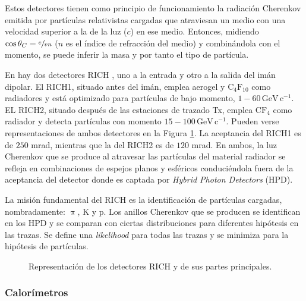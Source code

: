 Estos detectores tienen como principio de funcionamiento la radiación Cherenkov emitida por partículas relativistas cargadas que atraviesan un medio con una velocidad superior a la de la luz ($c$) en ese medio. Entonces, midiendo $\cos \theta_C = \sfrac{c}{vn}$ ($n$ es el índice de refracción del medio) y combinándola con el momento, se puede inferir la masa y por tanto el tipo de partícula.

En \lhcb hay dos detectores RICH \cite{Alves:1129809}, uno a la entrada y otro a la salida del imán dipolar. El RICH1, situado antes del imán, emplea aerogel y $\mathrm{C_4F_{10}}$ como radiadores y está optimizado para partículas de bajo momento, $1-60 \, \mathrm{GeV\, c^{-1}}$. EL RICH2, situado después de las estaciones de trazado Tx, emplea $\mathrm{CF_4}$ como radiador y detecta partículas con momento $15-100 \, \mathrm{GeV\, c^{-1}}$. Pueden verse representaciones de ambos detectores en la Figura \ref{fig_richdectectors}.
%
La aceptancia del RICH1 es de $250$ mrad, mientras que la del RICH2 es de $120$ mrad. En ambos, la luz Cherenkov que se produce al atravesar las partículas del material radiador se refleja en combinaciones de espejos planos y esféricos conduciéndola fuera de la aceptancia del detector donde es captada por \textit{Hybrid Photon Detectors} (HPD).

La misión fundamental del RICH es la identificación de partículas cargadas, nombradamente: $\uppi$, K y p.  Los anillos Cherenkov que se producen se identifican en los HPD  y se comparan con ciertas distribuciones para diferentes hipótesis en las trazas. Se define una \emph{likelihood} para todas las trazas y se minimiza para la hipótesis de partículas.

\begin{figure}[H]
\centering
{} \hfill
{} \hfill
\caption{Representación de los detectores RICH y de sus partes principales.} \label{fig_richdectectors}
\end{figure}



\subsubsection{Calorímetros} %

